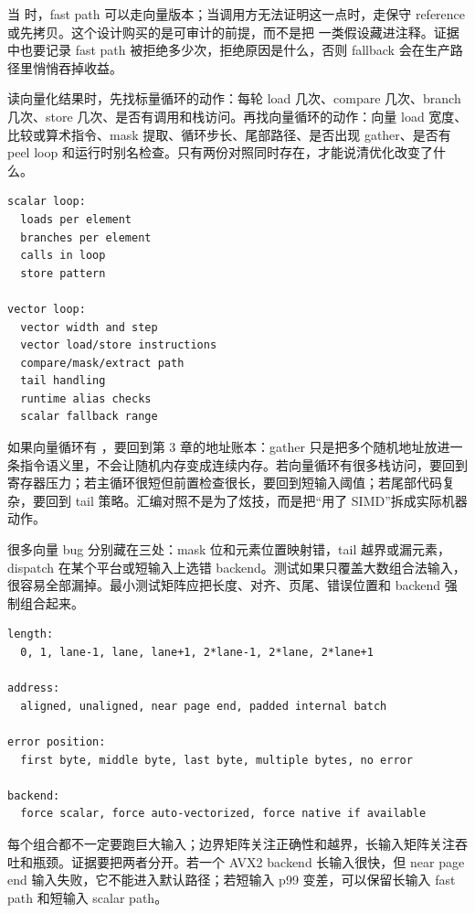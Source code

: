 当  时，fast path 可以走向量版本；当调用方无法证明这一点时，走保守 reference 或先拷贝。这个设计购买的是可审计的前提，而不是把  一类假设藏进注释。证据中也要记录 fast path 被拒绝多少次，拒绝原因是什么，否则 fallback 会在生产路径里悄悄吞掉收益。

读向量化结果时，先找标量循环的动作：每轮 load 几次、compare 几次、branch 几次、store 几次、是否有调用和栈访问。再找向量循环的动作：向量 load 宽度、比较或算术指令、mask 提取、循环步长、尾部路径、是否出现 gather、是否有 peel loop 和运行时别名检查。只有两份对照同时存在，才能说清优化改变了什么。

\begin{lstlisting}[numbers=none,caption={反汇编对照记录}]
scalar loop:
  loads per element
  branches per element
  calls in loop
  store pattern

vector loop:
  vector width and step
  vector load/store instructions
  compare/mask/extract path
  tail handling
  runtime alias checks
  scalar fallback range
\end{lstlisting}

如果向量循环有 ，要回到第 3 章的地址账本：gather 只是把多个随机地址放进一条指令语义里，不会让随机内存变成连续内存。若向量循环有很多栈访问，要回到寄存器压力；若主循环很短但前置检查很长，要回到短输入阈值；若尾部代码复杂，要回到 tail 策略。汇编对照不是为了炫技，而是把“用了 SIMD”拆成实际机器动作。

很多向量 bug 分别藏在三处：mask 位和元素位置映射错，tail 越界或漏元素，dispatch 在某个平台或短输入上选错 backend。测试如果只覆盖大数组合法输入，很容易全部漏掉。最小测试矩阵应把长度、对齐、页尾、错误位置和 backend 强制组合起来。

\begin{lstlisting}[numbers=none,caption={向量测试矩阵的最小维度}]
length:
  0, 1, lane-1, lane, lane+1, 2*lane-1, 2*lane, 2*lane+1

address:
  aligned, unaligned, near page end, padded internal batch

error position:
  first byte, middle byte, last byte, multiple bytes, no error

backend:
  force scalar, force auto-vectorized, force native if available
\end{lstlisting}

每个组合都不一定要跑巨大输入；边界矩阵关注正确性和越界，长输入矩阵关注吞吐和瓶颈。证据要把两者分开。若一个 AVX2 backend 长输入很快，但 near page end 输入失败，它不能进入默认路径；若短输入 p99 变差，可以保留长输入 fast path 和短输入 scalar path。

